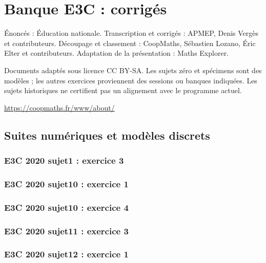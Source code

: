 \documentclass[lang=fr,edition=teacher,layout=sheet]{mxbook}
\begin{document}
\chapter*{Banque E3C : corrigés}
Énoncés : Éducation nationale. Transcription et corrigés : APMEP, Denis Vergès et contributeurs. Découpage et classement : CoopMaths, Sébastien Lozano, Éric Elter et contributeurs. Adaptation de la présentation : Maths Explorer.\par\medskip
\noindent Documents adaptés sous licence CC BY-SA. Les sujets zéro et spécimens sont des modèles ; les autres exercices proviennent des sessions ou banques indiquées. Les sujets historiques ne certifient pas un alignement avec le programme actuel.
\par\smallskip\url{https://coopmaths.fr/www/about/}
\clearpage\section*{Suites numériques et modèles discrets}
\subsection*{E3C 2020 sujet1 : exercice 3}
\begingroup\endgroup
\par\bigskip
{}\subsection*{E3C 2020 sujet10 : exercice 1}
\begingroup\endgroup
\par\bigskip
{}\subsection*{E3C 2020 sujet10 : exercice 4}
\begingroup\endgroup
\par\bigskip
{}\subsection*{E3C 2020 sujet11 : exercice 3}
\begingroup\endgroup
\par\bigskip
{}\subsection*{E3C 2020 sujet12 : exercice 1}
\end{document}
